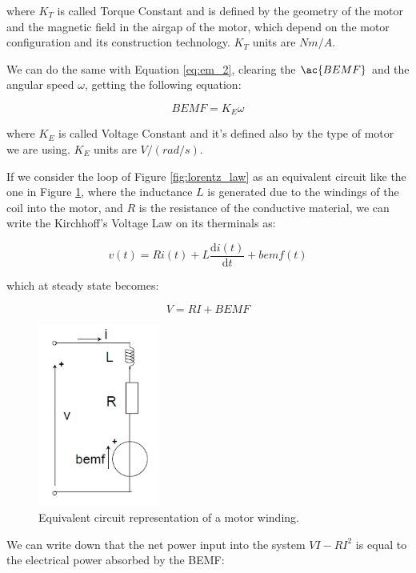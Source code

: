 where $K_{T}$ is called Torque Constant and is defined by the geometry of the motor and the magnetic field in the airgap of the motor, which depend on the motor configuration and its construction technology. $K_{T}$ units are $Nm/A$.

We can do the same with Equation \ref{eq:em_2}, clearing the $\ac{BEMF}$ and the angular speed $\omega$, getting the following equation:

\begin{equation}
	\label{eq:ke}
	BEMF = K_{E} \omega
\end{equation}

where $K_{E}$ is called Voltage Constant and it's defined also by the type of motor we are using. $K_{E}$ units are $V/(rad/s)$.

If we consider the loop of Figure \ref{fig:lorentz_law} as an equivalent circuit like the one in Figure \ref{fig:eq_motor}, where the inductance $L$ is generated due to the windings of the coil into the motor, and $R$ is the resistance of the conductive material, we can write the Kirchhoff's Voltage Law on its therminals as: 

\begin{equation}
	v(t) = R i(t) + L  \frac{\mathrm{d} i(t)}{\mathrm{d} t} + bemf(t)
\end{equation}

which at steady state becomes:

\begin{equation}
	\label{eq:KVL_coil}
	V = R I + BEMF
\end{equation}

\begin{figure}[htbp]
\centering
\includegraphics[width=4cm]{Images/eq_motor.png} 
\caption[DC Motor Electrical Model]{Equivalent circuit representation of a motor winding.}
\label{fig:eq_motor}
\end{figure}

We can write down that the net power input into the system $VI-RI^{2}$ is equal to the electrical power absorbed by the \ac{BEMF}:

